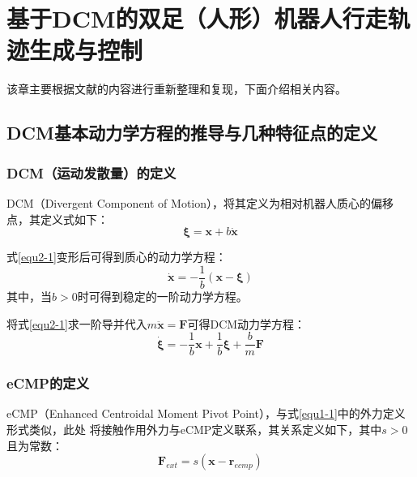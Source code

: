 \section{基于DCM的双足（人形）机器人行走轨迹生成与控制}
    该章主要根据文献\cite{englsbergerThreedimensionalBipedalWalking2013}的内容进行重新整理和复现，下面介绍相关内容。
    \subsection{DCM基本动力学方程的推导与几种特征点的定义}
        \subsubsection{DCM（运动发散量）的定义}
            DCM（Divergent Component of Motion），将其定义为相对机器人质心的偏移点，其定义式如下：
            \begin{equation}
                \boldsymbol{\xi }=\boldsymbol{x}+b\boldsymbol{\dot{x}}
                \label{equ2-1}
            \end{equation}

            式\eqref{equ2-1}变形后可得到质心的动力学方程：
            \begin{equation}
                \boldsymbol{\dot{x}}=-\frac{1}{b}\left( \boldsymbol{x}-\boldsymbol{\xi } \right) 
                \label{equ2-2}
            \end{equation}
            其中，当$b>0$时可得到稳定的一阶动力学方程。

            将式\eqref{equ2-1}求一阶导并代入$m\boldsymbol{\ddot{x}}=\boldsymbol{F}$可得DCM动力学方程：
            \begin{equation}
                \boldsymbol{\dot{\xi}}=-\frac{1}{b}\boldsymbol{x}+\frac{1}{b}\boldsymbol{\xi }+\frac{b}{m}\boldsymbol{F} 
                \label{equ2-3}
            \end{equation}
        \subsubsection{eCMP的定义}
            eCMP（Enhanced Centroidal Moment Pivot Point），与式\eqref{equ1-1}中的外力定义形式类似，此处
            将接触作用外力与eCMP定义联系，其关系定义如下，其中$s>0$且为常数：
            \begin{equation}
                \boldsymbol{F}_{ext}=s\left( \boldsymbol{x}-\boldsymbol{r}_{ecmp} \right) 
                \label{equ2-4}
            \end{equation}


